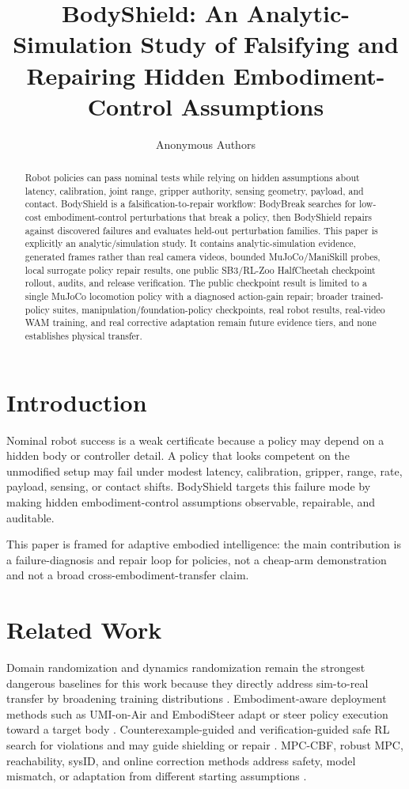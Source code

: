 \documentclass[10pt,conference]{IEEEtran}
\title{BodyShield: An Analytic-Simulation Study of Falsifying and Repairing Hidden Embodiment-Control Assumptions}
\author{Anonymous Authors}
\begin{document}
\maketitle
\begin{abstract}
Robot policies can pass nominal tests while relying on hidden assumptions about latency, calibration, joint range, gripper authority, sensing geometry, payload, and contact. BodyShield is a falsification-to-repair workflow: BodyBreak searches for low-cost embodiment-control perturbations that break a policy, then BodyShield repairs against discovered failures and evaluates held-out perturbation families. This paper is explicitly an analytic/simulation study. It contains analytic-simulation evidence, generated frames rather than real camera videos, bounded MuJoCo/ManiSkill probes, local surrogate policy repair results, one public SB3/RL-Zoo HalfCheetah checkpoint rollout, audits, and release verification. The public checkpoint result is limited to a single MuJoCo locomotion policy with a diagnosed action-gain repair; broader trained-policy suites, manipulation/foundation-policy checkpoints, real robot results, real-video WAM training, and real corrective adaptation remain future evidence tiers, and none establishes physical transfer.
\end{abstract}

\section{Introduction}
Nominal robot success is a weak certificate because a policy may depend on a hidden body or controller detail. A policy that looks competent on the unmodified setup may fail under modest latency, calibration, gripper, range, rate, payload, sensing, or contact shifts. BodyShield targets this failure mode by making hidden embodiment-control assumptions observable, repairable, and auditable.

This paper is framed for adaptive embodied intelligence: the main contribution is a failure-diagnosis and repair loop for policies, not a cheap-arm demonstration and not a broad cross-embodiment-transfer claim.

\section{Related Work}
Domain randomization and dynamics randomization remain the strongest dangerous baselines for this work because they directly address sim-to-real transfer by broadening training distributions \cite{tobin2017domainrandomization,peng2018dynamicsrandomization,openai2018dexterous,openai2019rubiks}. Embodiment-aware deployment methods such as UMI-on-Air and EmbodiSteer adapt or steer policy execution toward a target body \cite{gupta2025umionair,wang2026embodisteer}. Counterexample-guided and verification-guided safe RL search for violations and may guide shielding or repair \cite{karunakaran2020counterexampleguided,le2025verificationguided}. MPC-CBF, robust MPC, reachability, sysID, and online correction methods address safety, model mismatch, or adaptation from different starting assumptions \cite{zeng2021mpccbf,jiang2024transic}.
\end{document}
